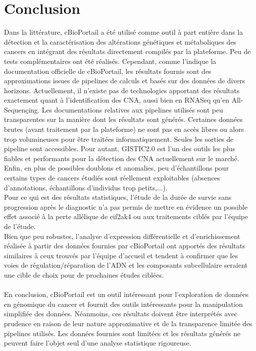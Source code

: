 \documentclass{style}
\begin{document}
\section{Conclusion}
Dans la littérature, cBioPortail a été utilisé comme outil à part entière dans la détection et la caractérisation des altérations génétiques et métaboliques des cancers en intégrant des résultats directement compilés par la plateforme. Peu de tests complémentaires ont été réalisés. Cependant, comme l’indique la documentation officielle de cBioPortail, les résultats fournis sont des approximations issues de pipelines de calculs et basés sur des données de divers horizons. Actuellement, il n'existe pas de technologies apportant des résultats exactement quant à l’identification des CNA, aussi bien en RNASeq qu’en All-Sequençing. Les documentations relatives aux pipelines utilisés sont peu transparentes sur la manière dont les résultats sont générés. Certaines données brutes (avant traitement par la plateforme) ne sont pas en accès libres ou alors trop volumineuses pour être traitées informatiquement. Seules les sorties de pipeline sont accessibles. Pour autant, GISTIC2.0 est l’un des outils les plus fiables et performants pour la détection des CNA actuellement sur le marché. Enfin, en plus de possibles doublons et anomalies, peu d’échantillons pour certains types de cancers étudiés sont réellement exploitables (absences d’annotations, échantillons d’individus trop petits,...). \\
Pour ce qui est des résultats statistiques, l’étude de la durée de survie sans progression après le diagnostic n’a pas permis de mettre en évidence un possible effet associé à la perte allélique de eif2ak4 ou aux traitements ciblés par l’équipe de l’étude. \\
Bien que peu robustes, l'analyse d'expression différentielle et d’enrichissement réalisée à partir des données fournies par cBioPortail ont apportés des résultats similaires à ceux trouvés par l’équipe d'accueil et tendent à confirmer que les voies de régulation/réparation de l’ADN et les composants subcellulaire seraient une cible de choix pour de prochaines études ciblées. \\ \\
En conclusion, cBioPortail est un outil intéressant pour l’exploration de données en génomique du cancer et fournit des outils intéressants pour la manipulation simplifiée des données.  Néanmoins, ces résultats doivent être interprétés avec prudence en raison de leur nature approximative et de la transparence limitée des pipelines utilisés. Les données fournies sont limitées et les résultats générés ne peuvent faire l’objet seul d’une analyse statistique rigoureuse. 
\end{document}
